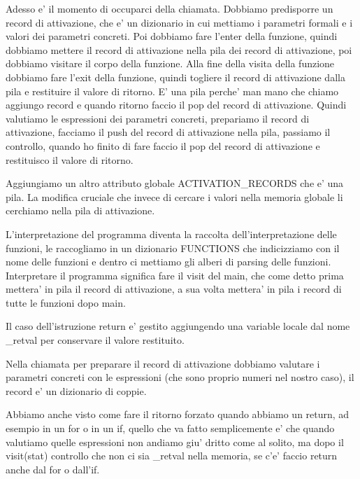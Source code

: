 Adesso e' il momento di occuparci della chiamata. Dobbiamo predisporre un record di attivazione, che e' un dizionario in cui mettiamo i parametri formali e i valori dei parametri concreti. Poi dobbiamo fare l'enter della funzione, quindi dobbiamo mettere il record di attivazione nella pila dei record di attivazione, poi dobbiamo visitare il corpo della funzione. Alla fine della visita della funzione dobbiamo fare l'exit della funzione, quindi togliere il record di attivazione dalla pila e restituire il valore di ritorno. E' una pila perche' man mano che chiamo aggiungo record e quando ritorno faccio il pop del record di attivazione. Quindi valutiamo le espressioni dei parametri concreti, prepariamo il record di attivazione, facciamo il push del record di attivazione nella pila, passiamo il controllo, quando ho finito di fare faccio il pop del record di attivazione e restituisco il valore di ritorno.

Aggiungiamo un altro attributo globale ACTIVATION\_RECORDS che e' una pila. La modifica cruciale che invece di cercare i valori nella memoria globale li cerchiamo nella pila di attivazione.

L'interpretazione del programma diventa la raccolta dell'interpretazione delle funzioni, le raccogliamo in un dizionario FUNCTIONS che indicizziamo con il nome delle funzioni e dentro ci mettiamo gli alberi di parsing delle funzioni.
Interpretare il programma significa fare il visit del main, che come detto prima mettera' in pila il record di attivazione, a sua volta mettera' in pila i record di tutte le funzioni dopo main.

Il caso dell'istruzione return e' gestito aggiungendo una variable locale dal nome \_retval per conservare il valore restituito.

Nella chiamata per preparare il record di attivazione dobbiamo valutare i parametri concreti con le espressioni (che sono proprio numeri nel nostro caso), il record e' un dizionario di coppie.

Abbiamo anche visto come fare il ritorno forzato quando abbiamo un return, ad esempio in un for o in un if, quello che va fatto semplicemente e' che quando valutiamo quelle espressioni non andiamo giu' dritto come al solito, ma dopo il visit(stat) controllo che non ci sia \_retval nella memoria, se c'e' faccio return anche dal for o dall'if.